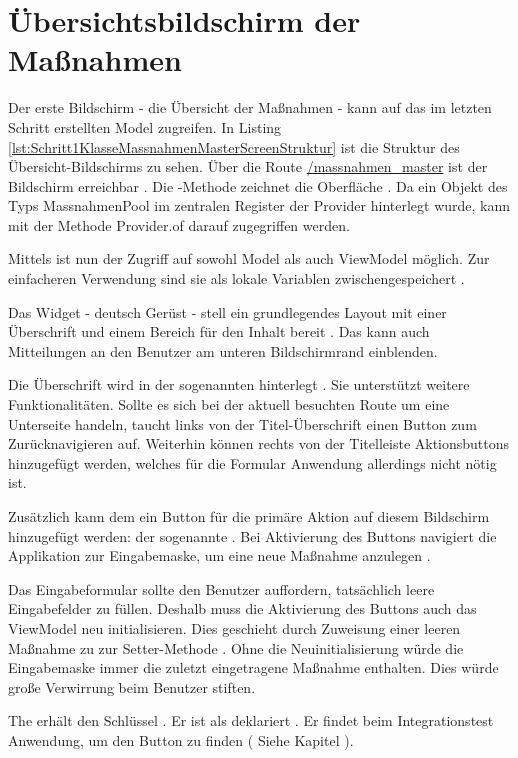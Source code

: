 
\ifIncludeFigures \clearpage \fi
\section{Übersichtsbildschirm der Maßnahmen}

Der erste Bildschirm - die Übersicht der Maßnahmen - kann auf das im letzten Schritt erstellten Model zugreifen.
In Listing \ref{lst:Schritt1KlasseMassnahmenMasterScreenStruktur}  ist die Struktur des Übersicht-Bildschirms zu sehen. Über die Route \url{/massnahmen_master} ist der Bildschirm erreichbar . Die -Methode zeichnet die Oberfläche .  Da ein Objekt des Typs
MassnahmenPool im zentralen  Register der Provider hinterlegt wurde, kann mit der Methode Provider.of darauf zugegriffen werden.

Mittels  ist nun der Zugriff auf sowohl Model als auch ViewModel möglich. Zur einfacheren Verwendung sind sie als lokale Variablen zwischengespeichert .

Das Widget  - deutsch Gerüst -  stell  ein grundlegendes Layout mit einer Überschrift und einem Bereich für den Inhalt bereit .
Das  kann auch Mitteilungen an den Benutzer am unteren Bildschirmrand einblenden.

Die Überschrift wird in der sogenannten  hinterlegt .
Sie unterstützt weitere Funktionalitäten.
Sollte es sich bei der aktuell besuchten Route  um eine Unterseite handeln, taucht links von der Titel-Überschrift einen Button zum Zurücknavigieren auf.
Weiterhin können rechts von der Titelleiste Aktionsbuttons hinzugefügt werden, welches für die Formular Anwendung allerdings nicht nötig ist.

Zusätzlich kann dem  ein Button für die primäre Aktion auf diesem Bildschirm hinzugefügt werden: der sogenannte  .
Bei Aktivierung des Buttons navigiert die Applikation zur Eingabemaske, um eine neue Maßnahme anzulegen .

Das Eingabeformular sollte den Benutzer auffordern, tatsächlich leere Eingabefelder zu füllen.
Deshalb muss die Aktivierung des Buttons auch das ViewModel neu initialisieren.
Dies geschieht durch Zuweisung einer leeren Maßnahme zu zur Setter-Methode  . Ohne die Neuinitialisierung würde die Eingabemaske immer die zuletzt eingetragene Maßnahme enthalten. Dies würde große Verwirrung beim Benutzer stiften.

The  erhält den Schlüssel  .
Er ist als  deklariert .
Er findet beim Integrationstest Anwendung, um den Button zu finden ( Siehe Kapitel ).

